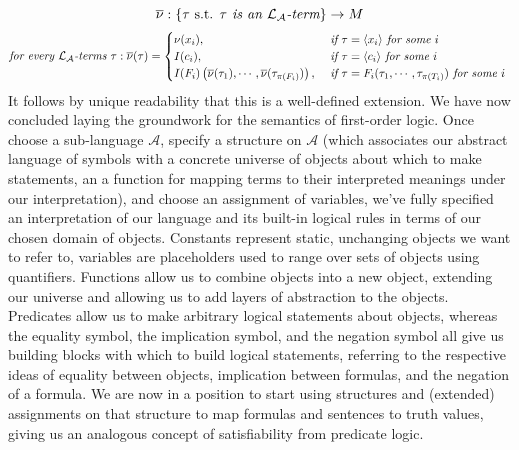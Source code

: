 \documentclass{article}
\begin{document}
    $$ \overline{\nu}: \{ \tau \textnormal{ s.t. } \textit{$ \tau $ is an $ \mathcal{L}_\mathcal{A} $-term} \} \rightarrow M $$
    $$ \textit{for every $ \mathcal{L}_\mathcal{A} $-terms } \tau: \overline{\nu}(\tau) = \begin{cases}
        \nu(x_i), &\textit{ if } \tau = \langle x_i \rangle \textit{ for some $ i $ } \\
        I(c_i), &\textit{ if } \tau = \langle c_i \rangle \textit{ for some $ i $ } \\
        I(F_i) \left(\overline{\nu}(\tau_1), \cdots, \overline{\nu}(\tau_{\pi(F_i)}) \right), &\textit{ if } \tau = F_i(\tau_1, \cdots, \tau_{\pi(T_i)}) \textit{ for some $ i $ }
    \end{cases} $$
\n
It follows by unique readability that this is a well-defined extension. We have now concluded laying the groundwork for the semantics of first-order logic. Once choose a sub-language $ \mathcal{A} $, specify a structure on $ \mathcal{A} $ (which associates our abstract language of symbols with a concrete universe of objects about which to make statements, an a function for mapping terms to their interpreted meanings under our interpretation), and choose an assignment of variables, we've fully specified an interpretation of our language and its built-in logical rules in terms of our chosen domain of objects. Constants represent static, unchanging objects we want to refer to, variables are placeholders used to range over sets of objects using quantifiers. Functions allow us to combine objects into a new object, extending our universe and allowing us to add layers of abstraction to the objects. Predicates allow us to make arbitrary logical statements about objects, whereas the equality symbol, the implication symbol, and the negation symbol all give us building blocks with which to build logical statements, referring to the respective ideas of equality between objects, implication between formulas, and the negation of a formula. We are now in a position to start using structures and (extended) assignments on that structure to map formulas and sentences to truth values, giving us an analogous concept of satisfiability from predicate logic.
\end{document}
